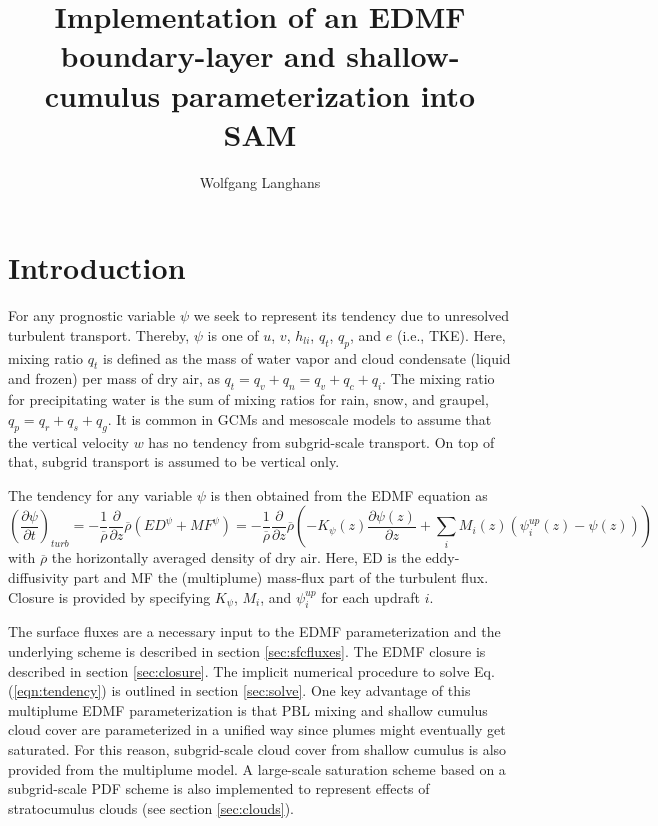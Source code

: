 \documentclass[dvipdfmx,a4paper,10pt]{article}
\title{Implementation of an EDMF boundary-layer and shallow-cumulus parameterization into SAM}
\author{Wolfgang Langhans}
\begin{document}
\maketitle
\tableofcontents



\section{Introduction}\label{se:intro}

For any prognostic variable $\psi$ we seek to represent its tendency due to unresolved turbulent transport. Thereby, $\psi$ is one of $u$, $v$, $h_{li}$, $q_t$, $q_p$, and $e$ (i.e., TKE). Here, mixing ratio $q_t$ is defined as the mass of water vapor and cloud condensate (liquid and frozen) per mass of dry air, as $q_t=q_v+q_n=q_v+q_c+q_i$. The mixing ratio for precipitating water is the sum of mixing ratios for rain, snow, and graupel, $q_p=q_r+q_s+q_g$. It is common in GCMs and mesoscale models to assume that the vertical velocity $w$ has no tendency from subgrid-scale transport. On top of that, subgrid transport is assumed to be vertical only. 

The tendency for any variable $\psi$ is then obtained from the EDMF equation as
\begin{equation}\label{eqn:tendency}
 \left(\frac{\partial \psi}{\partial t}\right)_{turb} =-\frac{1}{\overline{\rho}}\frac{\partial }{\partial z} \overline{\rho} \left( ED^{\psi} + MF^{\psi}\right) = -\frac{1}{\overline{\rho}}\frac{\partial }{\partial z} \overline{\rho}\left( -K_{\psi}(z)\frac{\partial \psi(z)}{\partial z} + \sum_i M_i(z) (\psi^{up}_i(z) - \psi(z) )\right)
\end{equation}
with $\overline{\rho}$ the horizontally averaged density of dry air. Here, ED is the eddy-diffusivity part and MF the (multiplume) mass-flux part of the turbulent flux. Closure is provided by specifying $K_{\psi}$, $M_i$, and $\psi^{up}_i$ for each updraft $i$.

The surface fluxes are a necessary input to the EDMF parameterization and the underlying scheme is described in section \ref{sec:sfcfluxes}. The EDMF closure is described in section \ref{sec:closure}. The implicit numerical procedure to solve Eq. (\ref{eqn:tendency}) is outlined in section \ref{sec:solve}. One key advantage of this multiplume EDMF parameterization is that PBL mixing and shallow cumulus cloud cover are parameterized in a unified way since plumes might eventually get saturated. For this reason, subgrid-scale cloud cover from shallow cumulus is also provided from the multiplume model. A large-scale saturation scheme based on a subgrid-scale PDF scheme is also implemented to represent effects of stratocumulus clouds (see section \ref{sec:clouds}).
\end{document}
